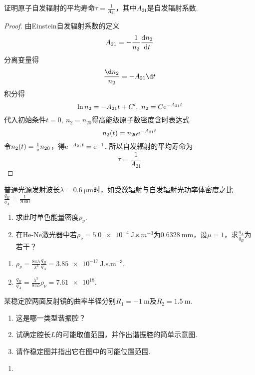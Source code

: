 \begin{problem}
	证明原子自发辐射的平均寿命$\tau=\frac{1}{A_{21}}$，其中$A_{21}$是自发辐射系数.
\end{problem}
\begin{proof}
	由Einstein自发辐射系数的定义
	\[A_{21}=-\frac{1}{n_2}\odv{n_2}{t}\]
	分离变量得
	\[\frac{\d n_2}{n_2}=-A_{21}\d t\]
	积分得
	\[\ln n_2=-A_{21}t+C',\ n_2=C\e^{-A_{21}t}\]
	代入初始条件$t=0,\ n_2=n_{20}$得高能级原子数密度含时表达式
	\[n_2(t)=n_{20}\mathrm{e}^{-A_{21}t}\]
	令$n_2(t)=\frac{1}{\mathrm{e}}n_{20}$，得$\mathrm{e}^{-A_{21}t}=\mathrm{e}^{-1}$. 所以自发辐射的平均寿命为
	\[\tau=\frac{1}{A_{21}}\]
\end{proof}

\begin{problem}
	普通光源发射波长$\lambda=\qty{0.6}{\um}$时，如受激辐射与自发辐射光功率体密度之比$\frac{q_B}{q_A}=\frac{1}{2000}$
\begin{enumerate}
	\item 求此时单色能量密度$\rho_\nu$.
	\item 在He-Ne激光器中若$\rho_\nu=\qty{5.0e-4}{\J.\s.m^{-3}}$为$\qty{0.6328}{\mm}$，设$\mu=1$，求$\frac{q_A}{q_B}$为若干？
\end{enumerate}
\end{problem}
\begin{solution}
\begin{enumerate}
	\item $\rho_\nu=\frac{8\pi h}{\lambda^3}\frac{q_B}{q_A}=\qty{3.85e-17}{\J.\s.\m^{-3}}$.
	\item $\frac{q_B}{q_A}=\frac{\lambda^3}{8\pi h}\rho_\nu=\num{7.61e18}$.
\end{enumerate}
\end{solution}

\begin{problem}
	某稳定腔两面反射镜的曲率半径分别$R_1=\qty{-1}{\m}$及$R_2=\qty{1.5}{\m}$.
	\begin{enumerate}
		\item 这是哪一类型谐振腔？
		\item 试确定腔长$L$的可能取值范围，并作出谐振腔的简单示意图.
		\item 请作稳定图并指出它在图中的可能位置范围.
	\end{enumerate}
\end{problem}
\begin{solution}
\begin{enumerate}
	\item 
\end{enumerate}
\end{solution}